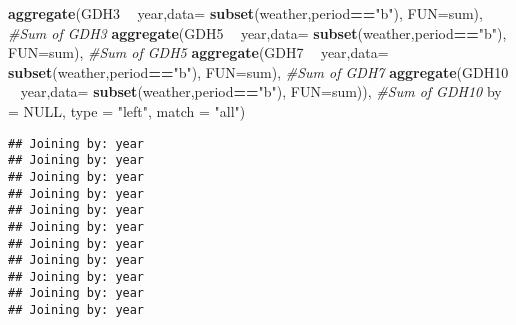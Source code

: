 \documentclass[10pt,]{article}
\newenvironment{Shaded}{\begin{snugshade}}{\end{snugshade}}
\newcommand{\KeywordTok}[1]{\textcolor[rgb]{0.13,0.29,0.53}{\textbf{#1}}}
\newcommand{\DataTypeTok}[1]{\textcolor[rgb]{0.13,0.29,0.53}{#1}}
\newcommand{\StringTok}[1]{\textcolor[rgb]{0.31,0.60,0.02}{#1}}
\newcommand{\CommentTok}[1]{\textcolor[rgb]{0.56,0.35,0.01}{\textit{#1}}}
\newcommand{\OtherTok}[1]{\textcolor[rgb]{0.56,0.35,0.01}{#1}}
\newcommand{\OperatorTok}[1]{\textcolor[rgb]{0.81,0.36,0.00}{\textbf{#1}}}
\newcommand{\NormalTok}[1]{#1}
\begin{document}
\begin{Shaded}
\begin{Highlighting}[]
    \KeywordTok{aggregate}\NormalTok{(GDH3 }\OperatorTok{~}\StringTok{ }\NormalTok{year,}\DataTypeTok{data=} \KeywordTok{subset}\NormalTok{(weather,period}\OperatorTok{==}\StringTok{"b"}\NormalTok{), }\DataTypeTok{FUN=}\NormalTok{sum),          }\CommentTok{#Sum of GDH3}
    \KeywordTok{aggregate}\NormalTok{(GDH5 }\OperatorTok{~}\StringTok{ }\NormalTok{year,}\DataTypeTok{data=} \KeywordTok{subset}\NormalTok{(weather,period}\OperatorTok{==}\StringTok{"b"}\NormalTok{), }\DataTypeTok{FUN=}\NormalTok{sum),          }\CommentTok{#Sum of GDH5}
    \KeywordTok{aggregate}\NormalTok{(GDH7 }\OperatorTok{~}\StringTok{ }\NormalTok{year,}\DataTypeTok{data=} \KeywordTok{subset}\NormalTok{(weather,period}\OperatorTok{==}\StringTok{"b"}\NormalTok{), }\DataTypeTok{FUN=}\NormalTok{sum),          }\CommentTok{#Sum of GDH7}
    \KeywordTok{aggregate}\NormalTok{(GDH10 }\OperatorTok{~}\StringTok{ }\NormalTok{year,}\DataTypeTok{data=} \KeywordTok{subset}\NormalTok{(weather,period}\OperatorTok{==}\StringTok{"b"}\NormalTok{), }\DataTypeTok{FUN=}\NormalTok{sum)),        }\CommentTok{#Sum of GDH10       }
    \DataTypeTok{by =} \OtherTok{NULL}\NormalTok{, }\DataTypeTok{type =} \StringTok{"left"}\NormalTok{, }\DataTypeTok{match =} \StringTok{"all"}\NormalTok{)}
\end{Highlighting}
\end{Shaded}

\begin{verbatim}
## Joining by: year
## Joining by: year
## Joining by: year
## Joining by: year
## Joining by: year
## Joining by: year
## Joining by: year
## Joining by: year
## Joining by: year
## Joining by: year
## Joining by: year
\end{verbatim}
\end{document}
